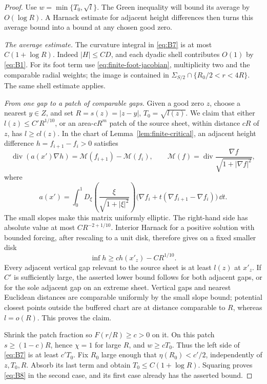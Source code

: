 \begin{proof}
Use $w=\min\{T_0,\sqrt l\}$. The Green inequality will bound its
average by $O(\log R)$. A Harnack estimate for adjacent height
differences then turns this average bound into a bound at any chosen
good zero.

\emph{The average estimate.}
The curvature integral in \eqref{eq:B7} is at most \(C(1+\log R)\).
Indeed \(|H|\le CD\), and each dyadic shell contributes \(O(1)\)
by \eqref{eq:B1}.  For its foot term use
\eqref{eq:finite-foot-jacobian}, multiplicity two and the comparable
radial weights; the image is contained in
\(\Sigma_{S/2}\cap\{R_0/2<r<4R\}\).
The same shell estimate applies.

\emph{From one gap to a patch of comparable gaps.}
Given a good zero \(z\), choose a nearest \(y\in Z\), and set
\(R=s(z)=|z-y|\), \(T_0=\sqrt{l(z)}\).
We claim that either \(l(z)\le C'R^{1/10}\), or an area-\(cR^m\)
patch of the source sheet, within distance \(cR\) of \(z\), has
\(l\ge c l(z)\).  In the chart of
Lemma~\ref{lem:finite-critical}, an adjacent height difference
\(h=f_{i+1}-f_i>0\) satisfies
\[
 \operatorname{div}(a(x')\nabla h)=\mathcal M(f_{i+1})-\mathcal M(f_i),\qquad
 \mathcal M(f)=\operatorname{div}\frac{\nabla f}{\sqrt{1+|\nabla f|^2}},
\]
where
\[
 a(x')=\int_0^1
 D_\xi\!\left(\frac{\xi}{\sqrt{1+|\xi|^2}}\right)
 \bigl(\nabla f_i+t(\nabla f_{i+1}-\nabla f_i)\bigr)\,\dd t.
\]
The small slopes make this matrix uniformly elliptic.  The right-hand
side has absolute value at most \(CR^{-2+1/10}\).
Interior Harnack for a positive solution with bounded forcing,
after rescaling to a unit disk, therefore gives on a fixed smaller disk
\[
 \inf h\ge c h(x'_z)-C R^{1/10}.
\]
Every adjacent vertical gap relevant to the source sheet is at least
\(l(z)\) at \(x'_z\).  If \(C'\) is sufficiently large, the asserted
lower bound follows for both adjacent gaps, or for the sole adjacent
gap on an extreme sheet.  Vertical gaps and nearest Euclidean distances
are comparable uniformly by the small slope bound; potential closest
points outside the buffered chart are at distance comparable to \(R\),
whereas \(l=o(R)\).  This proves the claim.

Shrink the patch fraction so \(F(r/R)\ge c>0\) on it.
On this patch \(s\ge(1-c)R\), hence \(\chi=1\) for large \(R\), and
\(w\ge cT_0\).  Thus the left side of \eqref{eq:B7} is at least \(c'T_0\).
Fix \(R_0\) large enough that \(\eta(R_0)<c'/2\), independently of
\(z,T_0,R\).  Absorb its last term and obtain
\(T_0\le C(1+\log R)\).  Squaring proves \eqref{eq:B8} in the second
case, and its first case already has the asserted bound.
\end{proof}

